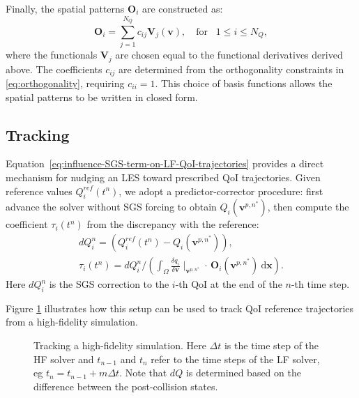 \documentclass[]{elsarticle}
\newcommand{\D}{\mathrm{d}}
\begin{document}
Finally, the spatial patterns $\boldsymbol{O}_i$ are constructed as:
\begin{equation}
    \boldsymbol{O}_i = \sum_{j=1}^{N_Q} c_{ij} \mathbf{V}_j(\boldsymbol{v}), \quad \textrm{for}\;\;\; 1 \leq i \leq N_Q,
\end{equation}
where the functionals $\mathbf{V}_j$ are chosen equal to the functional derivatives derived above. The coefficients $c_{ij}$ are determined from the orthogonality constraints in \eqref{eq:orthogonality}, requiring $c_{ii} = 1$. This choice of basis functions allows the spatial patterns to be written in closed form.

\subsection{Tracking}
Equation~\eqref{eq:influence-SGS-term-on-LF-QoI-trajectories} provides a direct mechanism for nudging an LES toward prescribed QoI trajectories. Given reference values $Q_i^{ref}(t^n)$, we adopt a predictor-corrector procedure: first advance the solver without SGS forcing to obtain $Q_i(\boldsymbol{v}^{p,n^*})$, then compute the coefficient $\tau_i(t^n)$ from the discrepancy with the reference:
\begin{align}
    dQ_i^{n} = \left(Q_i^{ref}(t^{n}) - Q_i(\boldsymbol{v}^{p,n^*}) \right), \label{eq:dQ-from-ref} \\
    \tau_i(t^n) =  dQ_i^{n} / \left( \int_\Omega \frac{\delta q_i}{\delta \boldsymbol{v}}\mid_{\boldsymbol{v}^{p,n^*}} \cdot \, \boldsymbol{O}_i(\boldsymbol{v}^{p,n^*}) \ \D \boldsymbol{x} \right). \label{eq:tau-from-dQ-for-tracking}
\end{align}
Here $dQ_i^{n}$ is the SGS correction to the $i$-th QoI at
 the end of the $n$-th time step.

Figure \ref{fig:tracking-diagram} illustrates how this setup can be used to track QoI reference trajectories from a high-fidelity simulation.

\begin{figure}
    \centering
    \resizebox{\textwidth}{!}{
    
    }
    \caption{Tracking a high-fidelity simulation. Here $\Delta t$ is the time step of the HF solver and $t_{n-1}$ and $t_n$ refer to the time steps of the LF solver, eg $t_n = t_{n-1}+m\Delta t$. Note that $dQ$ is determined based on the difference between the post-collision states.}
    \label{fig:tracking-diagram}
\end{figure}
\end{document}
